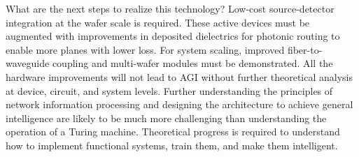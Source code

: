 \documentclass[twocolumn]{article}
\begin{document}
What are the next steps to realize this technology? Low-cost source-detector integration at the wafer scale is required. These active devices must be augmented with improvements in deposited dielectrics for photonic routing to enable more planes with lower loss. For system scaling, improved fiber-to-waveguide coupling and multi-wafer modules must be demonstrated. All the hardware improvements will not lead to AGI without further theoretical analysis at device, circuit, and system levels. Further understanding the principles of network information processing and designing the architecture to achieve general intelligence are likely to be much more challenging than understanding the operation of a Turing machine. Theoretical progress is required to understand how to implement functional systems, train them, and make them intelligent.



\end{document}
